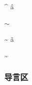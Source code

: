 \documentclass{ctexart}
\begin{document}
            {\rmfamily {}}

            \^{} \^a

            $\sim$
            
            \~{} \~a
            
            \textasciitilde

        \subsubsection{导言区}
\end{document}
